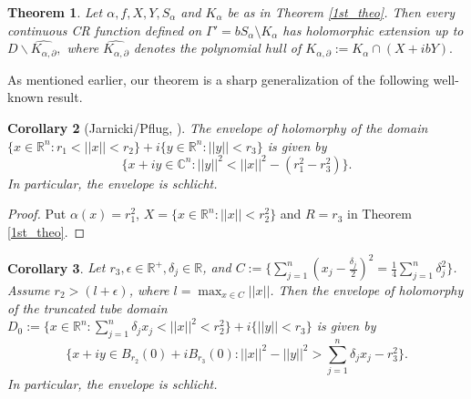 \documentclass[12pt,reqno, a4paper]{amsart}
\newtheorem{theorem}{Theorem}[section]
\newtheorem{corollary}[theorem]{Corollary}
\theoremstyle{definition}
\theoremstyle{definition}
\numberwithin{equation}{section}
\def\R{\mathbb{R}}                              %
\def\C{\mathbb{C}}                              %
\def\eps{\epsilon}
\begin{document}
\begin{theorem}
	Let $\alpha, f, X,Y, S_{\alpha}$ and $K_{\alpha}$ be as in Theorem \ref{1st_theo}. Then every continuous CR function defined on  $\Gamma'=bS_{\alpha}\setminus K_{\alpha}$ has holomorphic extension up to $D\backslash\widehat{K_{\alpha, \partial}},$ where  $\widehat{K_{\alpha,\partial}}$ denotes the polynomial hull of ${K_{\alpha,\partial}}:=K_{\alpha}\cap (X+ibY).$ 
\end{theorem}




As mentioned earlier, our theorem is a sharp generalization of the following well-known result.	
\begin{corollary}[Jarnicki/Pflug, \cite{JP2}]
The envelope of holomorphy of the domain $\{x \in \R^n: r_1<||x||<r_2\}+i\{y\in \R^n:||y||<r_3\}$ is given by $$\{x+iy\in \C^n:||y||^2<||x||^2-(r_1^2-r_3^2)\}.$$ In particular, the envelope is schlicht.
\end{corollary}	
\begin{proof}
Put $\alpha(x)=r_1^2$, $X=\{x\in \R^n: ||x||<r_2^2\}$ and $R=r_3$ in Theorem \ref{1st_theo}.
\end{proof}  
	\begin{corollary}
	Let $r_3,\eps \in \R^+,\delta_j\in \R$, and $C:=\{\sum_{j=1}^{n}(x_j-\frac{\delta_j}{2})^2= \frac{1}{4}{\sum_{j=1}^{n}\delta_j^2}\}$. Assume $r_2>(l+\eps)$, where $l=\max_{x\in C}||x||$.
	Then the envelope of holomorphy of the truncated tube domain $D_0:=\{x \in \R^n: \sum_{j=1}^{n}\delta_jx_j<||x||^2<r_2^2\}+i\{||y||<r_3\}$ is given by $$ \Big\{x+iy\in B_{r_2}(0)+iB_{r_3}(0): ||x||^2-||y||^2>\sum\limits_{j=1}^{n}\delta_jx_j-r_3^2\Big\}.$$ In particular, the envelope is schlicht.
\end{corollary}	
\end{document}
